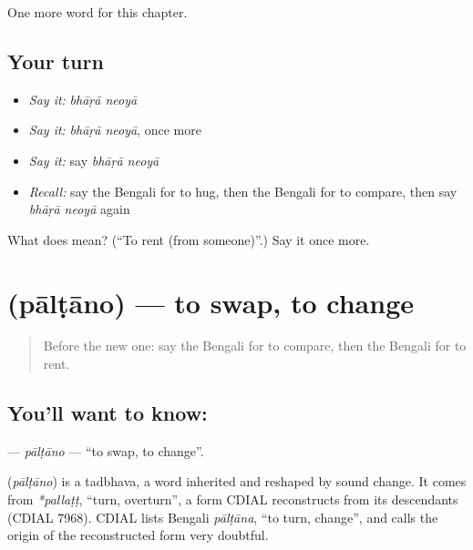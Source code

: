 \begin{grammarlens}[title={What you've built}]
One more word for this chapter.
\end{grammarlens}

\subsection*{Your turn}
\begin{itemize}
\raggedright
  \item \emph{Say it:} \emph{bhāṛā neoyā}
  \item \emph{Say it:} \emph{bhāṛā neoyā}, once more
  \item \emph{Say it:} say \emph{bhāṛā neoyā}
  \item \emph{Recall:} say the Bengali for to hug, then the Bengali for to compare, then say \emph{bhāṛā neoyā} again
\end{itemize}

\begin{tcolorbox}[breakable,colback=teal!4,colframe=teal!35!black,title={Before you move on}]
What does   mean? (\textquotedblleft{}To rent (from someone)\textquotedblright{}.) Say it once more.
\end{tcolorbox}
\section[\texorpdfstring{\bn{পাল্টানো} (pālṭāno)}{পাল্টানো (pālṭāno)}]{ (pālṭāno) — to swap, to change}

\label{lesson:BN-C212-paltano}



\begin{quote}
Before the new one: say the Bengali for to compare, then the Bengali for to rent.
\end{quote}

\subsection*{You'll want to know: }
\textbf{} — \emph{pālṭāno} — \textquotedblleft{}to swap, to change\textquotedblright{}.

\begin{cousinweb}
\textbf{} (\emph{pālṭāno}) is a tadbhava, a word inherited and reshaped by sound change. It comes from \emph{*pallaṭṭ}, \textquotedblleft{}turn, overturn\textquotedblright{}, a form CDIAL reconstructs from its descendants (CDIAL 7968). CDIAL lists Bengali \emph{pālṭāna}, \textquotedblleft{}to turn, change\textquotedblright{}, and calls the origin of the reconstructed form very doubtful.
\end{cousinweb}

